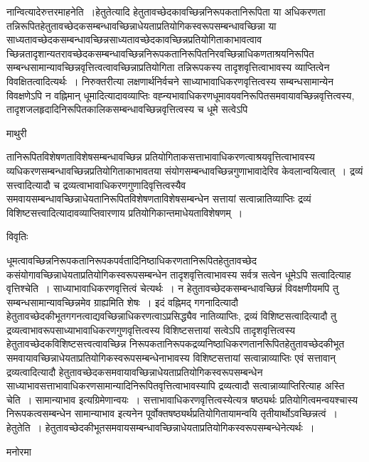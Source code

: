 \documentclass[10pt, openany]{book}
\begin{document}
{नान्वित्यादेरुत्तरमाह\textendash  नेति~।{\qt हेतुतेत्यादि }हेतुतावच्छेदकावच्छिन्ननिरूपकतानिरूपिता या अधिकरणता तन्निरूपितहेतुतावच्छेदकसम्बन्धावच्छिन्नाधेयताप्रतियोगिकस्वरूपसम्बन्धावच्छिन्ना या साध्यतावच्छेदकसम्बन्धावच्छिन्नसाध्यतावच्छेदकावच्छिन्नप्रतियोगिताकाभावत्वाव च्छिन्नतादृशान्यतरावच्छेदकसम्बन्धावच्छिन्ननिरूपकतानिरूपितनिरवच्छिन्नाधिकणताश्रयनिरूपित सम्बन्धसामान्यावच्छिन्नवृत्तित्वत्वावच्छिन्नाप्रतियोगिता तन्निरूपकस्य तादृशवृत्तित्वाभावस्य व्याप्तित्वेन विवक्षितत्वादित्यर्थः~। निरुक्तरीत्या लक्षणार्थनिर्वचने साध्याभावाधिकरणवृत्तित्वस्य सम्बन्धसामान्येन विवक्षणेऽपि न वह्निमान् धूमादित्यादावव्याप्तिः वह्न्यभावाधिकरणधूमावयवनिरूपितसमवायावच्छिन्नवृत्तित्वस्य,
तादृशजलहृदादिनिरूपितकालिकसम्बन्धावच्छिन्नवृत्तित्वस्य च धूमे सत्वेऽपि
\newpage
\begin{center}  माथुरी  \end{center}
{\la तानिरूपितविशेषणताविशेषसम्बन्धावच्छिन्न प्रतियोगिताकसत्ताभावाधिकरणत्वाश्रयवृत्तित्वाभावस्य व्यधिकरणसम्बन्धावच्छिन्नप्रतियोगिताकाभावतया संयोगसम्बन्धावच्छिन्नगुणाभावादेरिव केवलान्वयित्वात्~। द्रव्यं सत्त्वादित्यादौ च द्रव्यत्वाभावाधिकरणगुणादिवृत्तित्वस्यैव समवायसम्बन्धावच्छिन्नाधेयतानिरूपितविशेषणताविशेषसम्बन्धेन सत्तायां सत्वान्नातिव्याप्तिः द्रव्यं विशिष्टसत्त्वादित्यादावव्याप्तिवारणाय प्रतियोगिकान्तमाधेयताविशेषणम्~।}
\begin{center}     विवृतिः \end{center}
धूमत्वावच्छिन्ननिरूपकतानिरूपकपर्वतादिनिष्ठाधिकरणतानिरूपितहेतुतावच्छेद कसंयोगावच्छिन्नाधेयताप्रतियोगिकस्वरूपसम्बन्धेन तादृशवृत्तित्वाभावस्य सर्वत्र सत्वेन धूमेऽपि सत्वादित्याह वृत्तिश्चेति~। साध्याभावाधिकरणवृत्तित्वं चेत्यर्थः~। न हेतुतावच्छेदकसम्बन्धावच्छिन्नं विवक्षणीयमपि तु सम्बन्धसामान्यावच्छिन्नमेव ग्राह्यमिति शेषः~। इदं वह्निमद् गगनादित्यादौ हेतुतावच्छेदकीभूतगगनत्वाद्यवच्छिन्नाधिकरणत्वाऽप्रसिद्ध्यैव नातिव्याप्तिः, द्रव्यं विशिष्टसत्वादित्यादौ तु द्रव्यत्वाभावरूपसाध्याभावाधिकरणगुणवृत्तित्वस्य विशिष्टसत्तायां सत्वेऽपि तादृशवृत्तित्वस्य
हेतुतावच्छेदकविशिष्टसत्त्वत्वावच्छिन्न निरूपकतानिरूपकद्रव्यनिष्ठाधिकरणतानरूिपितहेतुतावच्छेदकीभूत समवायावच्छिन्नाधेयताप्रतियोगिकस्वरूपसम्बन्धेनाभावस्य विशिष्टसत्तायां सत्वान्नाव्याप्तिः एवं सत्तावान् द्रव्यत्वादित्यादौ हेतुतावच्छेदकसमवायावच्छिन्नाधेयताप्रतियोगिकस्वरूपसम्बन्धेन
साध्याभावसत्ताभावाधिकरणसामान्यादिनिरूपितवृत्तित्वाभावस्यापि द्रव्यत्वादौ सत्वान्नाव्याप्तिरित्याह \textendash अस्ति चेति~। सामान्याभाव इत्यग्रिमेणान्वयः~।
सत्ताभावाधिकरणवृत्तित्वस्येत्यत्र षष्ठ्यर्थः प्रतियोगित्वमन्वयश्चास्य निरूपकत्वसम्बन्धेन सामान्याभाव इत्यनेन पूर्वोक्तषष्ठ्यर्थप्रतियोगितायामन्वयि तृतीयार्थोऽवच्छिन्नत्वं~। {\qt हेतुतेति~}। हेतुतावच्छेदकीभूतसमवायसम्बन्धावच्छिन्नाधेयताप्रतियोगिकस्वरूपसम्बन्धेनेत्यर्थः~।
\begin{center}   मनोरमा  \end{center}

}
\end{document}
